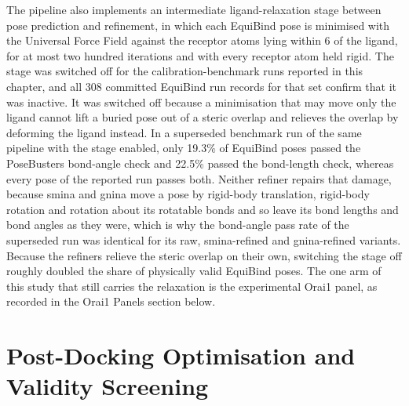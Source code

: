 The pipeline also implements an intermediate ligand-relaxation stage between pose prediction and refinement, in which each EquiBind pose is minimised with the Universal Force Field against the receptor atoms lying within 6\angstrom{} of the ligand, for at most two hundred iterations and with every receptor atom held rigid. The stage was switched off for the calibration-benchmark runs reported in this chapter, and all 308 committed EquiBind run records for that set confirm that it was inactive. It was switched off because a minimisation that may move only the ligand cannot lift a buried pose out of a steric overlap and relieves the overlap by deforming the ligand instead. In a superseded benchmark run of the same pipeline with the stage enabled, only 19.3\% of EquiBind poses passed the PoseBusters bond-angle check and 22.5\% passed the bond-length check, whereas every pose of the reported run passes both. Neither refiner repairs that damage, because smina and gnina move a pose by rigid-body translation, rigid-body rotation and rotation about its rotatable bonds and so leave its bond lengths and bond angles as they were, which is why the bond-angle pass rate of the superseded run was identical for its raw, smina-refined and gnina-refined variants. Because the refiners relieve the steric overlap on their own, switching the stage off roughly doubled the share of physically valid EquiBind poses. The one arm of this study that still carries the relaxation is the experimental Orai1 panel, as recorded in the Orai1 Panels section below.

\hypertarget{post-docking-optimisation-and-validity-screening}{%
\section{Post-Docking Optimisation and Validity Screening}\label{post-docking-optimisation-and-validity-screening}}

